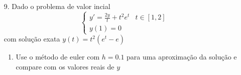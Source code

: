 \documentclass[a4paper, 11pt]{report}
\begin{document}
\begin{enumerate}[leftmargin=*, label=\textbf{\arabic*.}]
        



    \item[9.] Dado o problema de valor incial
    \[
        \left\{
        \begin{array}{ll}
            y' = \frac{2y}{t} + t^2 e^t & t \in [1,2]\\
            y(1) = 0 &
        \end{array}
        \right.
    \]
    com solução exata $y(t) = t^2 (e^t - e)$
    \begin{enumerate}[leftmargin=*, label=\alph*.]
        \item Use o método de euler com $h = 0.1$ para uma aproximação da solução e compare com os valores reais de $y$
        

\end{enumerate}
\end{enumerate}
\end{document}
